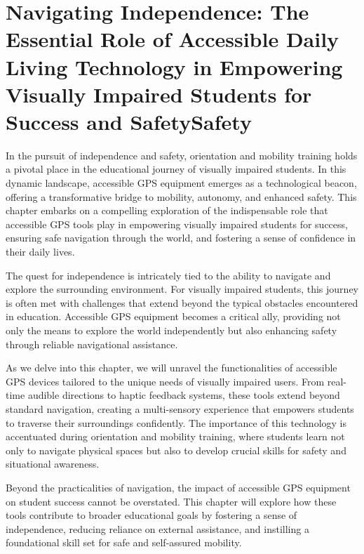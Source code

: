 \documentclass[12pt,letterpaper,twoside,openright]{report}
\begin{document}
\cleardoublepage\hypertarget{accessible-gps-mapping}{}\chapter[\raggedright Navigating Independence:\hfill\break The Essential Role of Accessible Daily Living Technology in\hfill\break Empowering Visually Impaired Students for Success and Safety]{Navigating Independence: The Essential Role of Accessible Daily Living Technology in Empowering Visually Impaired Students for Success and SafetySafety}\label{accessible-gps-mapping}
\minitoc \newpage
{}
In the pursuit of independence and safety, orientation and mobility training holds a pivotal place in the educational journey of visually impaired students. In this dynamic landscape, accessible GPS equipment emerges as a technological beacon, offering a transformative bridge to mobility, autonomy, and enhanced safety. This chapter embarks on a compelling exploration of the indispensable role that accessible GPS tools play in empowering visually impaired students for success, ensuring safe navigation through the world, and fostering a sense of confidence in their daily lives.

The quest for independence is intricately tied to the ability to navigate and explore the surrounding environment. For visually impaired students, this journey is often met with challenges that extend beyond the typical obstacles encountered in education. Accessible GPS equipment becomes a critical ally, providing not only the means to explore the world independently but also enhancing safety through reliable navigational assistance.

As we delve into this chapter, we will unravel the functionalities of accessible GPS devices tailored to the unique needs of visually impaired users. From real-time audible directions to haptic feedback systems, these tools extend beyond standard navigation, creating a multi-sensory experience that empowers students to traverse their surroundings confidently. The importance of this technology is accentuated during orientation and mobility training, where students learn not only to navigate physical spaces but also to develop crucial skills for safety and situational awareness.

Beyond the practicalities of navigation, the impact of accessible GPS equipment on student success cannot be overstated. This chapter will explore how these tools contribute to broader educational goals by fostering a sense of independence, reducing reliance on external assistance, and instilling a foundational skill set for safe and self-assured mobility.
\end{document}
